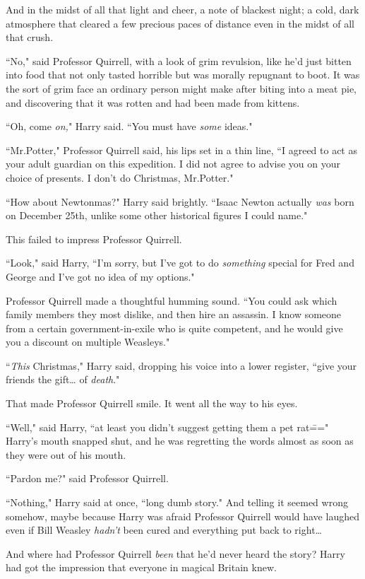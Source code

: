And in the midst of all that light and cheer, a note of blackest night; a cold, dark atmosphere that cleared a few precious paces of distance even in the midst of all that crush.

``No," said Professor Quirrell, with a look of grim revulsion, like he'd just bitten into food that not only tasted horrible but was morally repugnant to boot. It was the sort of grim face an ordinary person might make after biting into a meat pie, and discovering that it was rotten and had been made from kittens.

``Oh, come \emph{on,}" Harry said. ``You must have \emph{some} ideas."

``Mr.\?Potter," Professor Quirrell said, his lips set in a thin line, ``I agreed to act as your adult guardian on this expedition. I did not agree to advise you on your choice of presents. I don't do Christmas, Mr.\?Potter."

``How about Newtonmas?" Harry said brightly. ``Isaac Newton actually \emph{was} born on December 25th, unlike some other historical figures I could name."

This failed to impress Professor Quirrell.

``Look," said Harry, ``I'm sorry, but I've got to do \emph{something} special for Fred and George and I've got no idea of my options."

Professor Quirrell made a thoughtful humming sound. ``You could ask which family members they most dislike, and then hire an assassin. I know someone from a certain government-in-exile who is quite competent, and he would give you a discount on multiple Weasleys."

``\emph{This} Christmas," Harry said, dropping his voice into a lower register, ``give your friends the gift{\ldots} of \emph{death}."

That made Professor Quirrell smile. It went all the way to his eyes.

``Well," said Harry, ``at least you didn't suggest getting them a pet rat\===" Harry's mouth snapped shut, and he was regretting the words almost as soon as they were out of his mouth.

``Pardon me?" said Professor Quirrell.

``Nothing," Harry said at once, ``long dumb story." And telling it seemed wrong somehow, maybe because Harry was afraid Professor Quirrell would have laughed even if Bill Weasley \emph{hadn't} been cured and everything put back to right{\ldots}

And where had Professor Quirrell \emph{been} that he'd never heard the story? Harry had got the impression that everyone in magical Britain knew.

